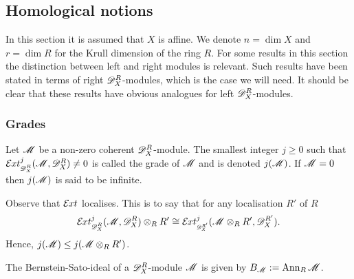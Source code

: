 \subsection{Homological notions}\label{sec: HomNotion}
In this section it is assumed that $X$ is affine. We denote $n = \dim X$ and $r = \dim R$ for the Krull dimension of the ring $R$.
For some results in this section the distinction between left and right modules is relevant.
Such results have been stated in terms of right $\mathscr{D}_X^R$-modules, which is the case we will need. It should be clear that these results have obvious analogues for left $\mathscr{D}_X^R$-modules.


\subsubsection{Grades}
\begin{definition}
  Let $\mathscr{M}$ be a non-zero coherent $\mathscr{D}_X^R$-module. The smallest integer $j\geq 0$ such that $\Ex{\D_X^R}{j}(\M,\D_X^R) \neq 0$ is called the grade of $\mathscr{M}$ and is denoted $j(\mathscr{M})$. If $\mathscr{M} = 0$ then $j(\mathscr{M})$ is said to be infinite.
\end{definition}
\begin{remark}
  Observe that $\mathcal{E}\mkern -1mu xt$ localises. This is to say that for any localisation $R'$ of $R$ $$\Ex{\D_X^R}{j}(\M,\D_X^R)\otimes_R R' \cong \Ex{\D_X^{R'}}{j}(\M\otimes_R R',\D_X^{R'}).$$
  Hence, $j(\mathscr{M})\leq j(\mathscr{M}\otimes_R R')$.
\end{remark}
\begin{definition}\label{def: BSIdeal}
  The Bernstein-Sato-ideal of a $\mathscr{D}_X^R$-module $\mathscr{M}$ is given by $B_{\mathscr{M}}:=\operatorname{Ann}_R \mathscr{M}$.
\end{definition}

